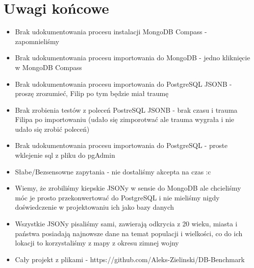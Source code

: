 \documentclass[11pt]{article}
\begin{document}
\section{Uwagi końcowe}
	\begin{itemize}
		\item Brak udokumentowania procesu instalacji MongoDB Compass - zapomnieliśmy
		\item Brak udokumentowania procesu importowania do MongoDB - jedno kliknięcie w MongoDB Compass
		\item Brak udokumentowania procesu importowania do PostgreSQL JSONB - proszę zrozumieć, Filip po tym będzie miał traumę
		\item Brak zrobienia testów z poleceń PostreSQL JSONB - brak czasu i trauma Filipa po importowaniu (udało się zimporotwać ale trauma wygrała i nie udało się zrobić poleceń)
		\item Brak udokumentowania procesu importowania do PostgreSQL - proste wklejenie sql z pliku do pgAdmin
		\item Słabe/Bezsensowne zapytania - nie dostaliśmy akcepta na czas :c
		\item Wiemy, że zrobiliśmy kiepskie JSONy w sensie do MongoDB ale chcieliśmy móc je prosto przekonwertować do PostgreSQL i nie mieliśmy nigdy doświedczenie w projektowaniu ich jako bazy danych
		\item Wszystkie JSONy pisaliśmy sami, zawierają odkrycia z 20 wieku, miasta i państwa posiadają najnowsze dane na temat populacji i wielkości, co do ich lokacji to korzystaliśmy z mapy z okresu zimnej wojny
		\item Cały projekt z plikami - https://github.com/Aleks-Zielinski/DB-Benchmark
	\end{itemize}
\end{document}
